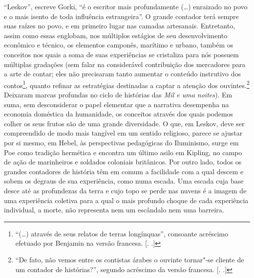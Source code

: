 ``Leskov'', escreve Gorki, ``é o escritor mais profundamente (\ldots{})
enraizado no povo e o mais isento de toda influência estrangeira''. O
grande contador terá sempre suas raízes no povo, e em primeiro lugar nas
camadas artesanais. Entretanto, assim como essas englobam, nos múltiplos
estágios de seu desenvolvimento econômico e técnico, os elementos
camponês, marítimo e urbano, também os conceitos nos quais a soma de
suas experiências se cristaliza para nós possuem múltiplas gradações 
(sem falar na considerável contribuição dos mercadores para a arte de
contar; eles não precisaram tanto aumentar o conteúdo instrutivo dos
contos\footnote{``(\ldots{}) através de seus relatos de terras longínquas'',
  consoante acréscimo efetuado por Benjamin na versão francesa. [. 
  .]}, quanto refinar as estratégias destinadas a captar a atenção
dos ouvintes.\footnote{``De fato, não vemos entre os contistas árabes o
  ouvinte tornar"-se cliente de um contador de histórias?'', segundo
  acréscimo da versão francesa. [. .]} Deixaram marcas
profundas no ciclo de histórias das \emph{Mil e uma noites}). Em suma,
sem desconsiderar o papel elementar que a narrativa desempenha na
economia doméstica da humanidade, os conceitos através dos quais podemos
colher os seus frutos são de uma grande diversidade. O que, em Leskov,
deve ser compreendido de modo mais tangível em um sentido religioso,
parece se ajustar por si mesmo, em Hebel, às perspectivas pedagógicas do
Iluminismo, surge em Poe como tradição hermética e encontra um último
asilo em Kipling, no campo de ação de marinheiros e soldados coloniais
britânicos. Por outro lado, todos os grandes contadores de história têm
em comum a facilidade com a qual descem e sobem os degraus de sua
experiência, como numa escada. Uma escada cuja base desce até as
profundezas da terra e cujo topo se perde nas nuvens é a imagem de uma
experiência coletiva para a qual o mais profundo choque de cada
experiência individual, a morte, não representa nem um escândalo nem uma
barreira.


